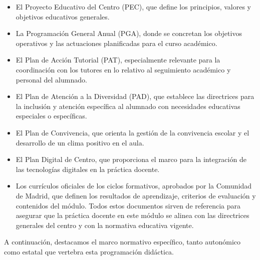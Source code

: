 \begin{itemize}
\item El Proyecto Educativo del Centro (PEC), que define los principios, valores y objetivos educativos generales.
\item La Programación General Anual (PGA), donde se concretan los objetivos operativos y las actuaciones planificadas para el curso académico.
\item El Plan de Acción Tutorial (PAT), especialmente relevante para la coordinación con los tutores en lo relativo al seguimiento académico y personal del alumnado.
\item El Plan de Atención a la Diversidad (PAD), que establece las directrices para la inclusión y atención específica al alumnado con necesidades educativas especiales o específicas.
\item El Plan de Convivencia, que orienta la gestión de la convivencia escolar y el desarrollo de un clima positivo en el aula.
\item El Plan Digital de Centro, que proporciona el marco para la integración de las tecnologías digitales en la práctica docente.
\item Los currículos oficiales de los ciclos formativos, aprobados por la Comunidad de Madrid, que definen los resultados de aprendizaje, criterios de evaluación y contenidos del módulo.
Todos estos documentos sirven de referencia para asegurar que la práctica docente en este módulo se alinea con las directrices generales del centro y con la normativa educativa vigente.
\end{itemize}

A continuación, destacamos el marco normativo específico, tanto autonómico como estatal que vertebra esta programación didáctica.